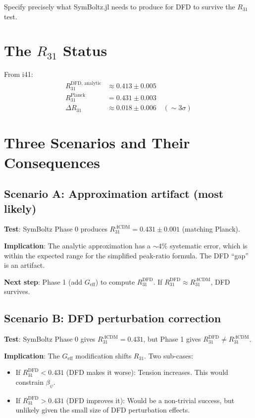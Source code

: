 \documentclass[11pt,a4paper]{article}
\begin{document}
Specify precisely what SymBoltz.jl needs to produce for DFD to survive the $R_{31}$ test.

\section{The $R_{31}$ Status}

From i41:
\begin{align}
R_{31}^{\text{DFD, analytic}} &\approx 0.413 \pm 0.005 \\
R_{31}^{\text{Planck}} &= 0.431 \pm 0.003 \\
\Delta R_{31} &\approx 0.018 \pm 0.006 \quad (\sim 3\sigma)
\end{align}

\section{Three Scenarios and Their Consequences}

\subsection{Scenario A: Approximation artifact (most likely)}

\textbf{Test}: SymBoltz Phase 0 produces $R_{31}^{\Lambda\text{CDM}} = 0.431 \pm 0.001$ (matching Planck).

\textbf{Implication}: The analytic approximation has a $\sim 4\%$ systematic error, which is within the expected range for the simplified peak-ratio formula. The DFD ``gap'' is an artifact.

\textbf{Next step}: Phase 1 (add $G_{\mathrm{eff}}$) to compute $R_{31}^{\mathrm{DFD}}$. If $R_{31}^{\mathrm{DFD}} \approx R_{31}^{\Lambda\mathrm{CDM}}$, DFD survives.

\subsection{Scenario B: DFD perturbation correction}

\textbf{Test}: SymBoltz Phase 0 gives $R_{31}^{\Lambda\text{CDM}} = 0.431$, but Phase 1 gives $R_{31}^{\mathrm{DFD}} \neq R_{31}^{\Lambda\mathrm{CDM}}$.

\textbf{Implication}: The $G_{\mathrm{eff}}$ modification shifts $R_{31}$. Two sub-cases:
\begin{itemize}
\item If $R_{31}^{\mathrm{DFD}} < 0.431$ (DFD makes it worse): Tension increases. This would constrain $\beta_\psi$.
\item If $R_{31}^{\mathrm{DFD}} > 0.431$ (DFD improves it): Would be a non-trivial success, but unlikely given the small size of DFD perturbation effects.
\end{itemize}
\end{document}
